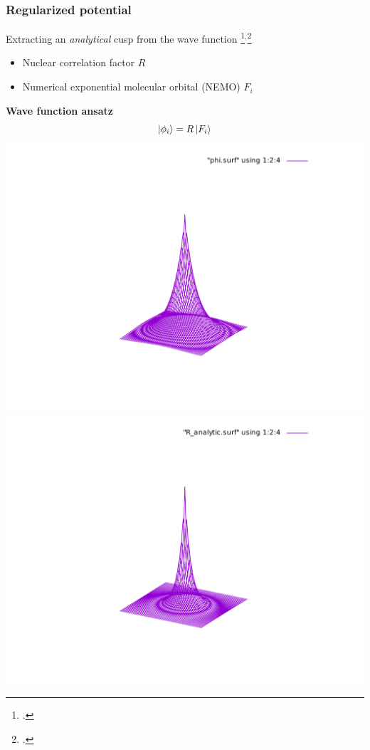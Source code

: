\begin{frame}
\frametitle{Regularized potential}

Extracting an \emph{analytical} cusp from the wave function
\footcite{Seelig_1966}$^,$\footcite{Bischoff_2014a}
\begin{itemize}
    \item Nuclear correlation factor $R$
    \item Numerical exponential molecular orbital (NEMO) $F_i$
\end{itemize}

\vspace{5mm}

\centering
\textbf{Wave function ansatz}
\begin{equation}
    \nonumber
    \ket{\phi_i} = R\ket{F_i}
\end{equation}
\includegraphics[scale=0.35, viewport = 175 90 430 400, clip]{figures/phi.pdf}
\includegraphics[scale=0.35, viewport = 175 90 430 400, clip]{figures/R.pdf}

\end{frame}
